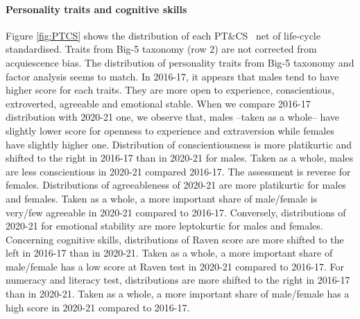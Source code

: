 \documentclass[a4paper, 12pt, onecolumn]{article}
\newcommand{\PTCS}{PT\&CS}
\begin{document}
\paragraph{Personality traits and cognitive skills}
Figure \ref{fig:PTCS} shows the distribution of each \PTCS~ net of life-cycle standardised.
Traits from Big-5 taxonomy (row 2) are not corrected from acquiescence bias.
The distribution of personality traits from Big-5 taxonomy and factor analysis seems to match.
In 2016-17, it appears that males tend to have higher score for each traits.
They are more open to experience, conscientious, extroverted, agreeable and emotional stable.
When we compare 2016-17 distribution with 2020-21 one, we observe that, males --taken as a whole-- have slightly lower score for openness to experience and extraversion while females have slightly higher one.
Distribution of conscientiousness is more platikurtic and shifted to the right in 2016-17 than in 2020-21 for males.
Taken as a whole, males are less conscientious in 2020-21 compared 2016-17.
The assessment is reverse for females.
Distributions of agreeableness of 2020-21 are more platikurtic for males and females.
Taken as a whole, a more important share of male/female is very/few agreeable in 2020-21 compared to 2016-17.
Conversely, distributions of 2020-21 for emotional stability are more leptokurtic for males and females.
Concerning cognitive skills, distributions of Raven score are more shifted to the left in 2016-17 than in 2020-21.
Taken as a whole, a more important share of male/female has a low score at Raven test in 2020-21 compared to 2016-17.
For numeracy and literacy test, distributions are more shifted to the right in 2016-17 than in 2020-21.
Taken as a whole, a more important share of male/female has a high score in 2020-21 compared to 2016-17.
\end{document}
